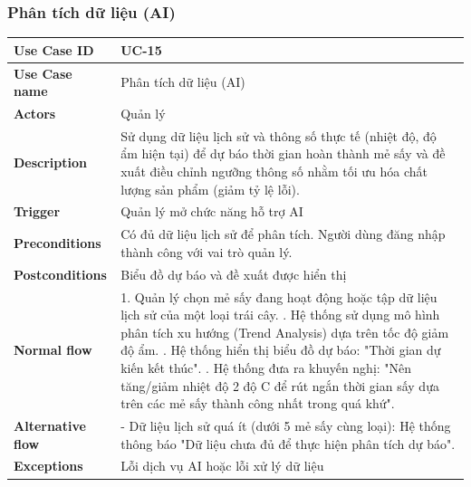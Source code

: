 \subsubsection{Phân tích dữ liệu (AI)}
\begin{tabular}{|p{3.5cm}|p{9.5cm}|}
\hline
\textbf{Use Case ID} & UC-15 \\
\hline
\textbf{Use Case name} & Phân tích dữ liệu (AI) \\
\hline
\textbf{Actors} & Quản lý \\
\hline
\textbf{Description} & 
Sử dụng dữ liệu lịch sử và thông số thực tế (nhiệt độ, độ ẩm hiện tại) để dự báo thời gian hoàn thành mẻ sấy và đề xuất điều chỉnh ngưỡng thông số nhằm tối ưu hóa chất lượng sản phẩm (giảm tỷ lệ lỗi). \\
\hline
\textbf{Trigger} & Quản lý mở chức năng hỗ trợ AI \\
\hline
\textbf{Preconditions} & Có đủ dữ liệu lịch sử để phân tích. Người dùng đăng nhập thành công với vai trò quản lý. \\
\hline
\textbf{Postconditions} & Biểu đồ dự báo và đề xuất được hiển thị \\
\hline
\textbf{Normal flow} & 
1. Quản lý chọn mẻ sấy đang hoạt động hoặc tập dữ liệu lịch sử của một loại trái cây. \newline
2. Hệ thống sử dụng mô hình phân tích xu hướng (Trend Analysis) dựa trên tốc độ giảm độ ẩm. \newline
3. Hệ thống hiển thị biểu đồ dự báo: "Thời gian dự kiến kết thúc". \newline
4. Hệ thống đưa ra khuyến nghị: "Nên tăng/giảm nhiệt độ 2 độ C để rút ngắn thời gian sấy dựa trên các mẻ sấy thành công nhất trong quá khứ". \\
\hline
\textbf{Alternative flow} & 
- Dữ liệu lịch sử quá ít (dưới 5 mẻ sấy cùng loại): Hệ thống thông báo "Dữ liệu chưa đủ để thực hiện phân tích dự báo". \\
\hline
\textbf{Exceptions} & Lỗi dịch vụ AI hoặc lỗi xử lý dữ liệu \\
\hline
\end{tabular}

